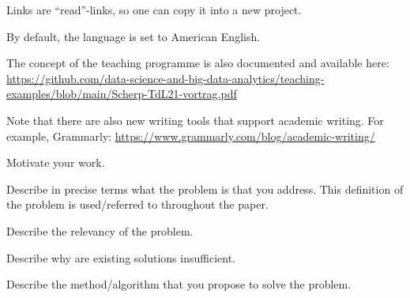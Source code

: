 \documentclass[manuscript, nonacm]{acmart}
\begin{document}
Links are ``read''-links, so one can copy it into a new project.

By default, the language is set to American English.

The concept of the teaching programme is also documented and available here:
\url{https://github.com/data-science-and-big-data-analytics/teaching-examples/blob/main/Scherp-TdL21-vortrag.pdf}

Note that there are also new writing tools that support academic writing. 
For example, Grammarly: \url{https://www.grammarly.com/blog/academic-writing/}

\label{sec:introduction}




Motivate your work.



Describe in precise terms what the problem is that you address. 
This definition of the problem is used/referred to throughout the paper.


Describe the relevancy of the problem. 


Describe why are existing solutions insufficient.



Describe the method/algorithm that you propose to solve the problem.

\end{document}
